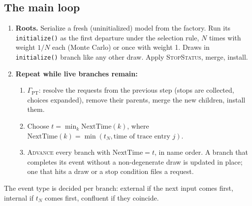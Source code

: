 \documentclass[11pt]{article}
\newcommand{\code}[1]{\texttt{#1}}
\begin{document}
\subsection{The main loop}
\begin{enumerate}
\item \textbf{Roots.} Serialize a fresh (uninitialized) model from the factory. Run its \code{initialize()} as the first
  departure under the selection rule, $N$ times with weight $1/N$ each (Monte Carlo) or once with weight 1. Draws in
  \code{initialize()} branch like any other draw. Apply \textsc{StopStatus}, merge, install.
\item \textbf{Repeat while live branches remain:}
  \begin{enumerate}
  \item $\Gamma_{\mathrm{PT}}$: resolve the requests from the previous step (stops are collected, choices expanded),
    remove their parents, merge the new children, install them.
  \item Choose $t=\min_k \mathrm{NextTime}(k)$, where $\mathrm{NextTime}(k)=\min(t_N, \text{time of trace entry } j)$.
  \item \textsc{Advance} every branch with $\mathrm{NextTime}=t$, in name order. A branch that completes its event without
    a non-degenerate draw is updated in place; one that hits a draw or a stop condition files a request.
  \end{enumerate}
\end{enumerate}
The event type is decided per branch: external if the next input comes first, internal if $t_N$ comes first,
confluent if they coincide.
\end{document}
